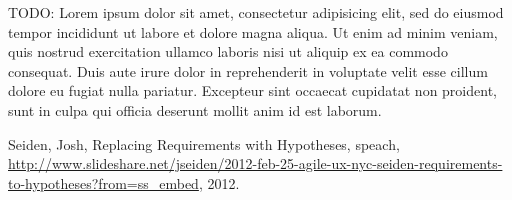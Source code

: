 \documentclass[12pt]{report}
\begin{document}
TODO: Lorem ipsum dolor sit amet, consectetur adipisicing elit, sed do eiusmod
tempor incididunt ut labore et dolore magna aliqua. Ut enim ad minim veniam,
quis nostrud exercitation ullamco laboris nisi ut aliquip ex ea commodo
consequat. Duis aute irure dolor in reprehenderit in voluptate velit esse
cillum dolore eu fugiat nulla pariatur. Excepteur sint occaecat cupidatat non
proident, sunt in culpa qui officia deserunt mollit anim id est laborum.




%
%

%
%
\begin{thebibliography}{00}
%
Seiden, Josh, Replacing Requirements with Hypotheses, speach, \url{http://www.slideshare.net/jseiden/2012-feb-25-agile-ux-nyc-seiden-requirements-to-hypotheses?from=ss_embed}, 2012.
%
\end{thebibliography}
% 
\end{document}
